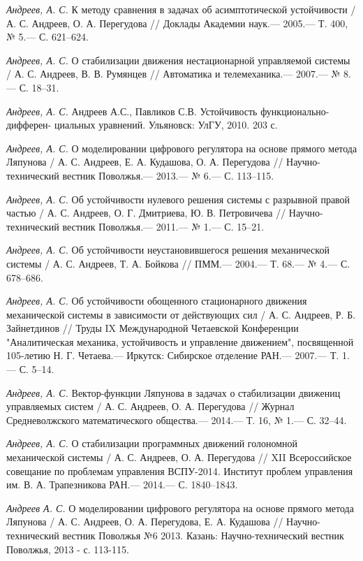 \begin{thebibliography}{10}
	{\it Андреев, А. С.} К методу сравнения в задачах об асимптотической устойчивости /
	А. С. Андреев, О. А. Перегудова // Доклады Академии наук.— 2005.— Т. 400, № 5.—
	С. 621–624.
	
	{\it Андреев, А. С.} О стабилизации движения нестационарной управляемой системы /
	А. С. Андреев, В. В. Румянцев // Автоматика и телемеханика.— 2007.— № 8.—
	С. 18–31.
	
	{\it Андреев, А. С.} Андреев А.С., Павликов С.В. Устойчивость функционально-дифферен-
	циальных уравнений. Ульяновск: УлГУ, 2010. 203 с.
	
	{\it Андреев, А. С.} О моделировании цифрового регулятора на основе прямого метода Ляпунова /
	А. С. Андреев, Е. А. Кудашова, О. А. Перегудова // Научно-технический вестник Поволжья.— 2013.— № 6.—
	С. 113–115.
	
	{\it Андреев, А. С.} Об устойчивости нулевого решения системы с разрывной правой частью /
	А. С. Андреев, О. Г. Дмитриева, Ю. В. Петровичева // Научно-технический вестник Поволжья.— 2011.— № 1.—
	С. 15–21.
	
	{\it Андреев, А. С.} Об устойчивости неустановившегося решения механической системы /
	А. С. Андреев, Т. А. Бойкова // ПММ.— 2004.— Т. 68.— № 4.— С. 678–686.
	
	{\it Андреев, А. С.} Об устойчивости обощенного стационарного движения механической системы в зависимости от действующих сил /
	А. С. Андреев, Р. Б. Зайнетдинов // Труды IX Международной Четаевской Конференции "Аналитическая механика, устойчивость и управление движением", посвященной 105-летию Н. Г. Четаева.— Иркутск: Сибирское отделение РАН.— 2007.— Т. 1.— С. 5–14.
	
	{\it Андреев, А. С.} Вектор-функции Ляпунова в задачах о стабилизации движениц управляемых систем /
	А. С. Андреев, О. А. Перегудова // Журнал Средневолжского математического общества.— 2014.— Т. 16, № 1.—
	С. 32–44.
	
	{\it Андреев, А. С.} О стабилизации программных движений голономной механической системы /
	А. С. Андреев, О. А. Перегудова // XII Всероссийское совещание по проблемам управления ВСПУ-2014. Институт проблем управления им. В. А. Трапезникова РАН.— 2014.— С. 1840–1843.
	
	{\it Андреев А. С.} О моделировании цифрового регулятора на основе прямого метода Ляпунова / А. С. Андреев, О. А. Перегудова, Е. А. Кудашова //
	Научно-технический вестник Поволжья №6 2013. Казань: Научно-технический вестник Поволжья, 2013 - с. 113-115.
	

\end{thebibliography}
